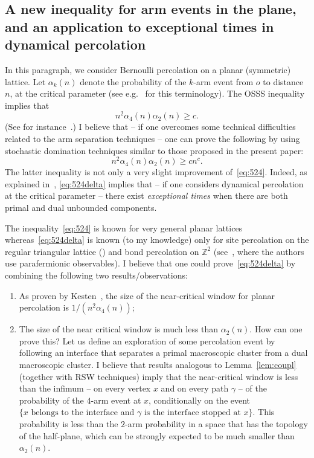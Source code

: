 \documentclass[10pt]{amsart}
\theoremstyle{definition}\newtheorem{defi}[theo]{Definition}\newtheorem{rema}[theo]{Remark}\newtheorem{exam}[theo]{Example}\newtheorem{exem}[theo]{Example}\newtheorem{nota}[theo]{Notation}
\newcommand{\Z}{\mathbb{Z}}
\begin{document}
\subsection{A new inequality for arm events in the plane, and an application to exceptional times in dynamical percolation}
In this paragraph, we consider Bernoulli percolation on a planar (symmetric) lattice. Let $\alpha_k(n)$ denote the probability of the $k$-arm event from $o$ to distance $n$, at the critical parameter (see e.g.~\cite[Chapter~2]{GS14} for this terminology). The OSSS inequality implies that
\begin{equation}\label{eq:524}
n^2\alpha_4(n)\alpha_2(n) \ge c.
\end{equation}
(See for instance~\cite[Chapter~12, Theorem~40]{GS14}.) I believe that -- if one overcomes some technical difficulties related to the arm separation techniques -- one can prove the following by using stochastic domination techniques similar to those proposed in the present paper:
\begin{equation}\label{eq:524delta}
n^2 \alpha_4(n)\alpha_2(n) \ge cn^c.
\end{equation}
The latter inequality is not only a very slight improvement of~\eqref{eq:524}. Indeed, as explained in~\cite{TV22}, \eqref{eq:524delta} implies that -- if one considers dynamical percolation at the critical parameter -- there exist \emph{exceptional times} when there are both primal and dual unbounded components.


The inequality~\eqref{eq:524} is known for very general planar lattices whereas~\eqref{eq:524delta} is known (to my knowledge) only for site percolation on the regular triangular lattice (\cite{SW01}) and bond percolation on $\Z^2$ (see~\cite{DMT21}, where the authors use parafermionic observables). I believe that one could prove~\eqref{eq:524delta} by combining the following two results/observations:
\begin{enumerate}
\item As proven by Kesten~\cite{Kes81}, the size of the near-critical window for planar percolation is $1/(n^2\alpha_4(n))$;
\item The size of the near critical window is much less than $\alpha_2(n)$. How can one prove this? Let us define an exploration of some percolation event by following an interface that separates a primal macroscopic cluster from a dual macroscopic cluster. I believe that results analogous to Lemma~\ref{lem:coupl} (together with RSW techniques) imply that the near-critical window is less than the infimum -- on every vertex $x$ and on every path $\gamma$ -- of the probability of the $4$-arm event at $x$, conditionally on the event $\{x \text{ belongs to the interface}$ and $\text{$\gamma$ is the interface stopped at $x$}\}$. This probability is less than the $2$-arm probability in a space that has the topology of the half-plane, which can be strongly expected to be much smaller than $\alpha_2(n)$.
\end{enumerate}
\end{document}
